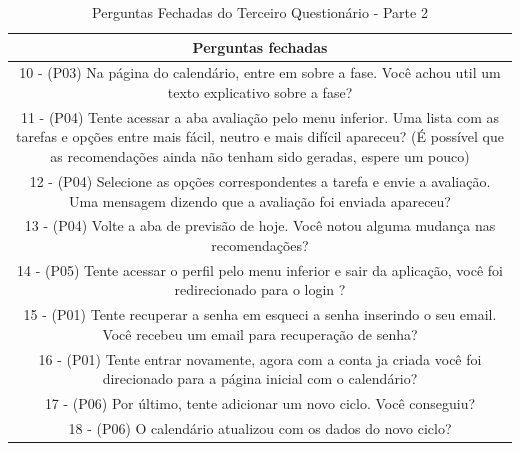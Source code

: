 \begin{table}[ht]
    \centering
    \caption{Perguntas Fechadas do Terceiro Questionário - Parte 2}
    \label{tab17}
    \begin{tabular}{c}
        \toprule
        \textbf{Perguntas fechadas} \\
        \midrule
        \begin{minipage} [t] {1\textwidth} 10 - (P03) Na página do calendário, entre em sobre a fase. Você achou util um texto explicativo sobre a fase? \end{minipage}\\
        \midrule
        \begin{minipage} [t] {1\textwidth} 11 - (P04) Tente acessar a aba avaliação pelo menu inferior. Uma lista com as tarefas e opções entre mais fácil, neutro e mais difícil apareceu? (É possível que as recomendações ainda não tenham sido geradas, espere um pouco) \end{minipage}\\
        \midrule
        \begin{minipage} [t] {1\textwidth} 12 - (P04) Selecione as opções correspondentes a tarefa e envie a avaliação. Uma mensagem dizendo que a avaliação foi enviada apareceu? \end{minipage}\\
        \midrule
        \begin{minipage} [t] {1\textwidth} 13 - (P04) Volte a aba de previsão de hoje. Você notou alguma mudança nas recomendações? \end{minipage}\\
        \midrule
        \begin{minipage} [t] {1\textwidth} 14 - (P05) Tente acessar o perfil pelo menu inferior e sair da aplicação, você foi redirecionado para o login ? \end{minipage}\\
        \midrule
        \begin{minipage} [t] {1\textwidth} 15 - (P01) Tente recuperar a senha em esqueci a senha inserindo o seu email. Você recebeu um email para recuperação de senha? \end{minipage}\\
        \midrule
        \begin{minipage} [t] {1\textwidth} 16 - (P01) Tente entrar novamente, agora com a conta ja criada você foi direcionado para a página inicial com o calendário? \end{minipage}\\
        \midrule
        \begin{minipage} [t] {1\textwidth} 17 - (P06) Por último, tente adicionar um novo ciclo. Você conseguiu? \end{minipage}\\
        \midrule
        \begin{minipage} [t] {1\textwidth} 18 - (P06) O calendário atualizou com os dados do novo ciclo? \end{minipage}\\
        \bottomrule
    \end{tabular}
\end{table}


